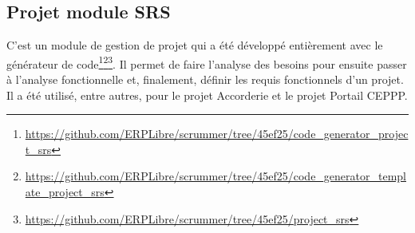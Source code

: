 






\subsection{Projet module SRS}

C’est un module de gestion de projet qui a été développé entièrement avec le générateur de code\footnote{\url{https://github.com/ERPLibre/scrummer/tree/45ef25/code_generator_project_srs}}\footnote{\url{https://github.com/ERPLibre/scrummer/tree/45ef25/code_generator_template_project_srs}}\footnote{\url{https://github.com/ERPLibre/scrummer/tree/45ef25/project_srs}}. Il permet de faire l’analyse des besoins pour ensuite passer à l’analyse fonctionnelle et, finalement, définir les requis fonctionnels d’un projet. Il a été utilisé, entre autres, pour le projet Accorderie et le projet Portail CEPPP.

